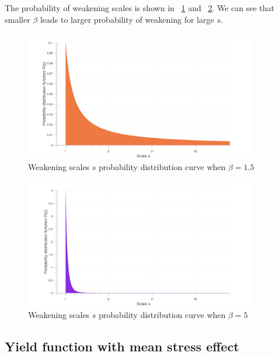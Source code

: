 \documentclass[3p,times,number,review]{elsarticle}
\newcommand{\figref}[1]{\figurename~\ref{#1}}
\begin{document}
The probability of weakening scales is shown in \figref{ps1} and \figref{ps2}. We can see that smaller $\beta$ leads to larger probability of weakening for large $s$.
\begin{figure}[!h]
\centering
\includegraphics[width=0.9\textwidth]{figures//ps1.png} 
\caption{Weakening scales $s$ probability distribution curve when $\beta=1.5$ }
\label{ps1}
\end{figure}
\begin{figure}[!h]
\centering
\includegraphics[width=0.9\textwidth]{figures//ps2.png} 
\caption{Weakening scales $s$ probability distribution curve when $\beta=5$ }
\label{ps2}
\end{figure}

\subsection{Yield function with mean stress effect}
\end{document}

